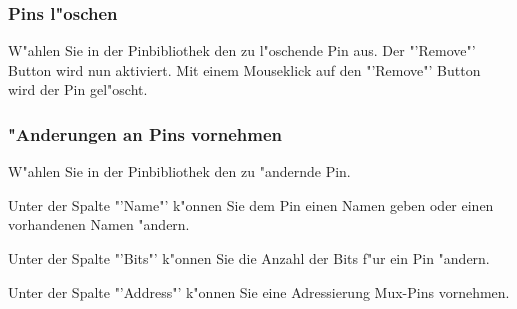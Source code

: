 \documentclass[a4paper,titlepage,12pt,ngerman]{scrbook}
\begin{document}
\subsubsection{Pins l"oschen}
W"ahlen Sie in der Pinbibliothek den zu l"oschende Pin aus. Der "'Remove"' Button wird nun aktiviert. Mit einem Mouseklick auf den "'Remove"' Button wird der Pin gel"oscht.
\subsubsection{"Anderungen an Pins vornehmen}
W"ahlen Sie in der Pinbibliothek den zu "andernde Pin.\par
Unter der Spalte "'Name"' k"onnen Sie dem Pin einen Namen geben oder einen vorhandenen Namen "andern.\par
Unter der Spalte "'Bits"' k"onnen Sie die Anzahl der Bits f"ur ein Pin "andern.\par
Unter der Spalte "'Address"' k"onnen Sie eine Adressierung Mux-Pins vornehmen.\par
\end{document}
